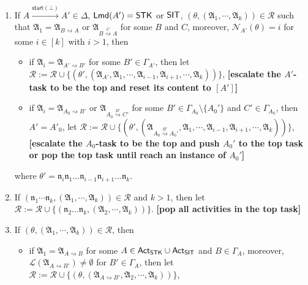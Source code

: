 \documentclass[preprint,12pt]{elsarticle}
\newcommand\act{{\sf Act}}
\newcommand\lmd{{\sf Lmd}}
\newcommand\singletask{{\sf STK}}
\newcommand\singleinstance{{\sf SIT}}
\newcommand\startactivity{{\mathsf{start} }}
\newcommand\namefun{\mathcal{N}}
\newcommand\aname{\mathfrak{n}}
\newcommand\AutReach{\mathscr{R}}
\newcommand{\STK}{\mathsf{STK}}
\newcommand{\SIT}{\mathsf{SIT}}
\newcommand\Aut{{\mathfrak{A} }}
\newcommand\Lang{{\mathscr{L} }}
\begin{document}
{\begin{minipage}{\textwidth}
{\begin{enumerate}
    \item If $A \xrightarrow{\startactivity(\bot)}A' \in\Delta$, $\lmd(A')=\STK$ or $\singleinstance$, $(\theta, (\Aut_1,\cdots,\Aut_k)) \in \AutReach$ such that 
    $\Aut_1 = \Aut_{B \rightsquigarrow A}$ or $\Aut_{B \stackrel{C}{\rightsquigarrow} A}$ for some $B$ and $C$,
    moreover, $\namefun_{A'}(\theta) = i$ for some $i \in [k]$ with $i > 1$, then
    \begin{itemize}
        \item if $\Aut_i = \Aut_{A'\rightsquigarrow B'}$ for some $B' \in \Gamma_{A'}$,
        then let $\AutReach:= \AutReach \cup \{(\theta', (\Aut_{A'}, \Aut_1, \cdots,\Aut_{i-1},\Aut_{i+1},\cdots,\Aut_{k}))\}$, 
        \textbf{[escalate the $A'$-task to be the top and reset its content to $[A']$]}
        \item if $\Aut_i = \Aut_{A_0\rightsquigarrow B'}$ or $\Aut_{A_0 \stackrel{B'}{\rightsquigarrow} C'}$ for some $B' \in \Gamma_{A_0}\setminus\{A_0'\}$ and $C' \in \Gamma_{A_0}$,
        then $A' = A'_0$,  let 
        $\AutReach:= \AutReach \cup \{(\theta', (\Aut_{A_0\stackrel{B'} {\rightsquigarrow} A_0'}, \Aut_1, \cdots,\Aut_{i-1},\Aut_{i+1},\cdots,\Aut_{k}))\}$,  
        \textbf{[escalate the $A_0$-task to be the top and push $A_0'$ to the top task or pop the top task until reach an instance of $A_0'$]}
    \end{itemize}
        where $\theta' = \aname_i\aname_1\dots\aname_{i-1}\aname_{i+1}\dots\aname_k$. 
    \item If $(\aname_1 \cdots \aname_k, (\Aut_1,\cdots,\Aut_k)) \in \AutReach$ and $k>1$, then let $\AutReach := \AutReach \cup \{(\aname_2\dots\aname_k, (\Aut_2,\cdots,\Aut_k))\}$.
        \textbf{[pop all activities in the top task]}
%
    \item If $(\theta, (\Aut_1,\cdots,\Aut_k)) \in \AutReach$, then
    \begin{itemize}
        \item if $\Aut_1 = \Aut_{A\rightsquigarrow B}$ for some $A\in\act_{\STK}\cup\act_{\SIT}$ and $B \in \Gamma_A$, moreover, $\Lang(\Aut_{A\rightsquigarrow B'}) \neq \emptyset$ for $B'  \in \Gamma_A$, then let $\AutReach := \AutReach \cup \{(\theta, (\Aut_{A\rightsquigarrow B'}, \Aut_2,\cdots,\Aut_k))\}$,
      

\end{itemize}
\end{enumerate}}
\end{minipage}}
\end{document}
